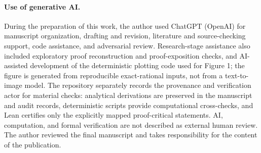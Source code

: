 \paragraph{Use of generative AI.}
During the preparation of this work, the author used ChatGPT (OpenAI) for manuscript organization, drafting and revision, literature and source-checking support, code assistance, and adversarial review. Research-stage assistance also included exploratory proof reconstruction and proof-exposition checks, and AI-assisted development of the deterministic plotting code used for Figure 1; the figure is generated from reproducible exact-rational inputs, not from a text-to-image model. The repository separately records the provenance and verification actor for material checks: analytical derivations are preserved in the manuscript and audit records, deterministic scripts provide computational cross-checks, and Lean certifies only the explicitly mapped proof-critical statements. AI, computation, and formal verification are not described as external human review. The author reviewed the final manuscript and takes responsibility for the content of the publication.
